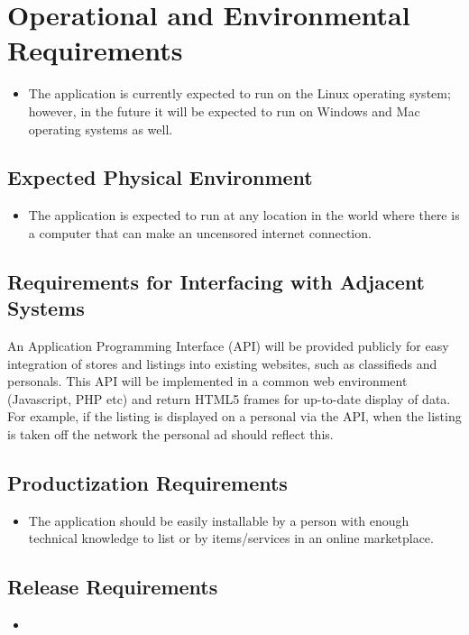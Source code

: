 \documentclass{article}
\begin{document}
\section{Operational and Environmental Requirements}
\begin{itemize}
	\item 
    The application is currently expected to run on the Linux operating system; however, in the future it will be expected to run on Windows and Mac operating systems as well.
\end{itemize}
\subsection{Expected Physical Environment}
\begin{itemize}
	\item 
	The application is expected to run at any location in the world where there is a computer that can make an uncensored internet connection.
\end{itemize}

\subsection{Requirements for Interfacing with Adjacent Systems}
An Application Programming Interface (API) will be provided publicly for easy integration of stores and listings into existing websites, such as classifieds and personals. This API will be implemented in a common web environment (Javascript, PHP etc) and return HTML5 frames for up-to-date display of data. For example, if the listing is displayed on a personal via the API, when the listing is taken off the network the personal ad should reflect this.

\subsection{Productization Requirements}
\begin{itemize}
	\item 
	The application should be easily installable by a person with enough technical knowledge to list or by items/services in an online marketplace.
\end{itemize}

\subsection{Release Requirements}
\begin{itemize}
	\item
\end{itemize}
\end{document}
